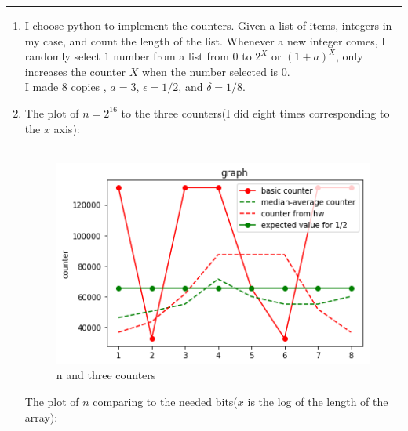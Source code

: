 \documentclass[11pt]{article}
\begin{document}




\begin{quote}

\end{quote}
\hrule


\begin{solution}
\item
\begin{enumerate}
    \item   I choose python to implement the counters. Given a list of items, integers in my case, and count the length of the list. Whenever a new integer comes, I randomly select $1$ number from a list from $0$ to $2^{X}$ or $(1+a)^{X}$, only increases the counter $X$ when the number selected is $0$.\\
    I made $8$ copies , $a = 3$,  $\epsilon = 1/2$, and $\delta = 1/8$. 
    \item The plot of $n = 2^{16}$ to the three counters(I did eight times corresponding to the $x$ axis):\\
    \\
    \begin{figure}[h]
    \centering
    \includegraphics[width=1\textwidth]{hw2/counters.png}
    \caption{n and three counters}
    \end{figure}
    \newpage
    The plot of $n$ comparing to the needed bits($x$ is the log of the length of the array):\\

\end{enumerate}
\end{solution}
\end{document}
